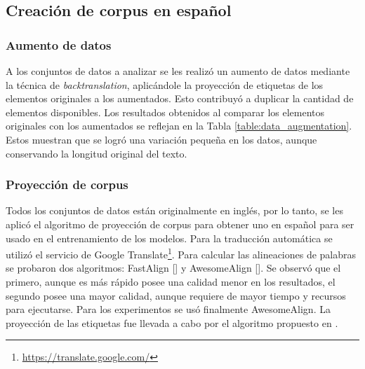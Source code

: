 \subsection{Creación de corpus en español}

\subsubsection{Aumento de datos}

A los conjuntos de datos a analizar se les realizó un aumento de datos mediante la técnica de \emph{backtranslation},
aplicándole la proyección de etiquetas de los elementos originales a los aumentados.
Esto contribuyó a duplicar la cantidad de elementos disponibles. Los resultados obtenidos al comparar los 
elementos originales con los aumentados se reflejan en la Tabla \ref{table:data_augmentation}.
Estos muestran que se logró una variación pequeña en los datos, aunque conservando la 
longitud original del texto. 

\begin{table}[h!]
	\begin{center}
	\caption{Datos promedios comparando los textos originales con los aumentados.}\label{table:data_augmentation}
	\end{center}
\end{table}

\subsubsection{Proyección de corpus}

Todos los conjuntos de datos están originalmente en inglés, por lo tanto, se les aplicó el algoritmo de proyección
de corpus para obtener uno en español para ser usado en el entrenamiento de los modelos. 
Para la traducción automática se utilizó el servicio de Google Translate\footnote{\href{https://translate.google.com/}{https://translate.google.com/}}. 
Para calcular las 
alineaciones de palabras se probaron dos algoritmos: FastAlign [\cite{dyer2013fastalign}] y AwesomeAlign 
[\cite{dou2021word}]. Se observó que el primero, aunque es más rápido posee una calidad menor en los resultados,
el segundo posee una mayor calidad, aunque requiere de mayor tiempo y recursos para ejecutarse. Para los experimentos
se usó finalmente AwesomeAlign. La proyección de las etiquetas fue llevada a cabo por el algoritmo propuesto 
en \textcite{eger2018cross}.

